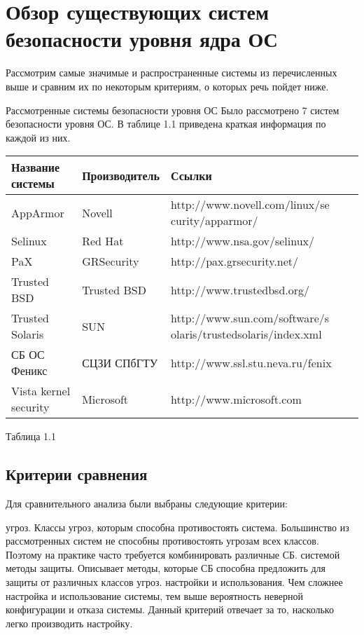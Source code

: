\section{Обзор существующих систем безопасности уровня ядра ОС}

\bigskip
Рассмотрим самые значимые и распространенные системы из
 перечисленных выше и сравним их по некоторым критериям, о 
которых речь пойдет ниже.


Рассмотренные системы безопасности уровня ОС 
Было рассмотрено 7 систем безопасности уровня ОС. 
В таблице 1.1 приведена краткая информация по каждой из них. 

\bigskip
\begin{tabular}{|p{4cm}|p{3cm}|p{6cm}|}
\hline
Название системы & Производитель & Ссылки \\
\hline
AppArmor & Novell & http://www.novell.com/linux/se
curity/apparmor/ \\
\hline
Selinux & Red Hat & http://www.nsa.gov/selinux/\\
\hline
PaX & GRSecurity & http://pax.grsecurity.net/\\
\hline
Trusted BSD & Trusted BSD & http://www.trustedbsd.org/\\
\hline 
Trusted Solaris & SUN & http://www.sun.com/software/s
olaris/trustedsolaris/index.xml\\
\hline
СБ ОС Феникс & СЦЗИ СПбГТУ & http://www.ssl.stu.neva.ru/fenix\\
\hline
Vista kernel security & Microsoft & http://www.microsoft.com\\
\hline
\end{tabular}

Таблица 1.1
\bigskip 
\subsection{Критерии сравнения}

Для сравнительного анализа были выбраны следующие критерии: 
\begin{itemize}
	 угроз. Классы угроз, которым способна 
	противостоять система. Большинство из рассмотренных
	систем не способны противостоять угрозам всех классов. 
	Поэтому на практике часто требуется комбинировать различные СБ. 
	 системой методы защиты. Описывает 
	методы, которые СБ способна предложить для защиты от 
	различных классов угроз. 
	 настройки и использования. Чем сложнее
	настройка и использование системы, тем выше вероятность 
	неверной конфигурации и отказа системы. Данный критерий 
	отвечает за то, насколько легко производить настройку. 
\end{itemize}

